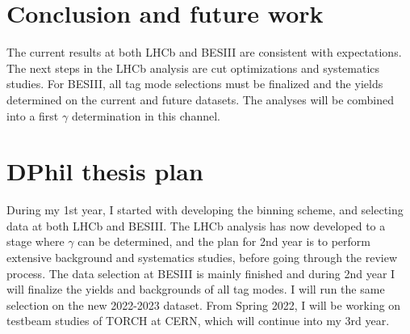 \documentclass[12pt, a4paper, notitlepage, onecolumn]{article}
\begin{document}
\section{Conclusion and future work}
\noindent The current results at both LHCb and BESIII are consistent with expectations. The next steps in the LHCb analysis are cut optimizations and systematics studies. For BESIII, all tag mode selections must be finalized and the yields determined on the current and future datasets. The analyses will be combined into a first $\gamma$ determination in this channel.




\newpage
\section*{DPhil thesis plan}
\noindent During my 1st year, I started with developing the binning scheme, and selecting data at both LHCb and BESIII. The LHCb analysis has now developed to a stage where $\gamma$ can be determined, and the plan for 2nd year is to perform extensive background and systematics studies, before going through the review process. The data selection at BESIII is mainly finished and during 2nd year I will finalize the yields and backgrounds of all tag modes. I will run the same selection on the new 2022-2023 dataset. From Spring 2022, I will be working on testbeam studies of TORCH at CERN, which will continue into my 3rd year.
\end{document}
